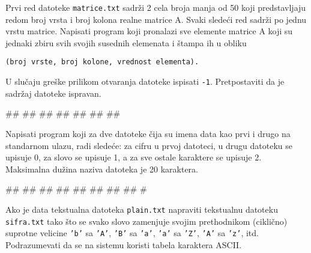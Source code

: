 \begin{Exercise}[label=p3_]         
Prvi red datoteke \verb|matrice.txt| sadr\v zi 2 cela broja manja od
50 koji predstavljaju redom broj vrsta i broj kolona realne matrice
A. Svaki slede\'ci red sadr\v zi po jednu vrstu matrice. Napisati
program koji pronalazi sve elemente matrice A koji su jednaki zbiru
svih svojih susednih elemenata i \v stampa ih u obliku
\begin{verbatim}
(broj vrste, broj kolone, vrednost elementa).
\end{verbatim}
U slu\v caju gre\v ske prilikom otvaranja datoteke ispisati {\tt -1}.
Pretpostaviti da je sadr\v zaj datoteke ispravan. \\
\begin{miditest}
\begin{upotreba}{1}
##
##
##
##
#\naslovIzlaz#
##
##
\end{upotreba}
\end{miditest}
\end{Exercise}
\begin{Answer}[ref=p3_]
\end{Answer}


\begin{Exercise}[label=p3_]         
Napisati program koji za dve datoteke \v cija su imena data kao prvi i
drugo na standarnom ulazu, radi slede\'ce: za cifru u prvoj datoteci,
u drugu datoteku se upisuje 0, za slovo se upisuje 1, a za sve ostale
karaktere se upisuje 2. Maksimalna du\v zina naziva datoteka je 20
karaktera. \\
\begin{miditest}
\begin{upotreba}{2}
#\naslovInt#
##
##
##
##
##
##
##
#
\end{upotreba}
\end{miditest}
\end{Exercise}
\begin{Answer}[ref=p3_]
\end{Answer}


\begin{Exercise}[label=p3_]         
Ako je data tekstualna datoteka \verb|plain.txt| napraviti tekstualnu
datoteku \verb|sifra.txt| tako \v sto se svako slovo zamenjuje svojim
prethodnikom (cikli\v cno) suprotne velicine \verb|’b’| sa \verb|’A’|,
\verb|’B’| sa \verb|’a’|, \verb|’a’| sa \verb|’Z’|, \verb|’A’| sa
\verb|’z’|, itd. Podrazumevati da se na sistemu koristi tabela
karaktera ASCII.
\end{Exercise}
\begin{Answer}[ref=p3_]
\end{Answer}


